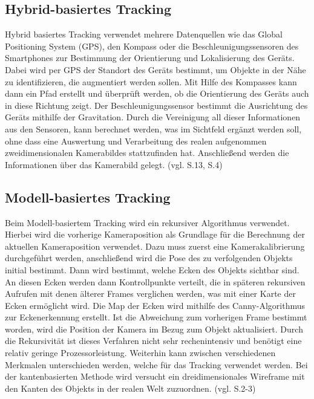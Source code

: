 \subsection{Hybrid-basiertes Tracking}

Hybrid basiertes Tracking verwendet mehrere Datenquellen wie das Global Positioning System (GPS), den Kompass oder die Beschleunigungssensoren des Smartphones zur Bestimmung der Orientierung und Lokalisierung des Geräts. Dabei wird per GPS der Standort des Geräts bestimmt, um Objekte in der Nähe zu identifizieren, die augmentiert werden sollen. Mit Hilfe des Kompasses kann dann ein Pfad erstellt und überprüft werden, ob die Orientierung des Geräts auch in diese Richtung zeigt. Der Beschleunigungssensor bestimmt die Ausrichtung des Geräts mithilfe der Gravitation. Durch die Vereinigung all dieser Informationen aus den Sensoren, kann berechnet werden, was im Sichtfeld ergänzt werden soll, ohne dass eine Auswertung und Verarbeitung des realen aufgenommen zweidimensionalen Kamerabildes stattzufinden hat. Anschließend werden die Informationen über das Kamerabild gelegt.  (vgl. \cite{comparative_sdks} S.13, \cite{vorraussetzungen} S.4)

\subsection{Modell-basiertes Tracking}

Beim Modell-basiertem Tracking wird ein rekursiver Algorithmus verwendet. Hierbei wird die vorherige Kameraposition als Grundlage für die Berechnung der aktuellen Kameraposition verwendet. Dazu muss zuerst eine Kamerakalibrierung durchgeführt werden, anschließend wird die Pose des zu verfolgenden Objekts initial bestimmt. Dann wird bestimmt, welche Ecken des Objekts sichtbar sind. An diesen Ecken werden dann Kontrollpunkte verteilt, die in späteren rekursiven Aufrufen mit denen älterer Frames verglichen werden, was mit einer Karte der Ecken ermöglicht wird. Die Map der Ecken wird mithilfe des Canny-Algorithmus zur Eckenerkennung erstellt. Ist die Abweichung zum vorherigen Frame bestimmt worden, wird die Position der Kamera im Bezug zum Objekt aktualisiert. Durch die Rekursivität ist dieses Verfahren nicht sehr rechenintensiv und benötigt eine relativ geringe Prozessorleistung. Weiterhin kann zwischen verschiedenen Merkmalen unterschieden werden, welche für das Tracking verwendet werden. Bei der kantenbasierten Methode wird versucht ein dreidimensionales Wireframe mit den Kanten des Objekts in der realen Welt zuzuordnen. (vgl. \cite{model_based} S.2-3)

